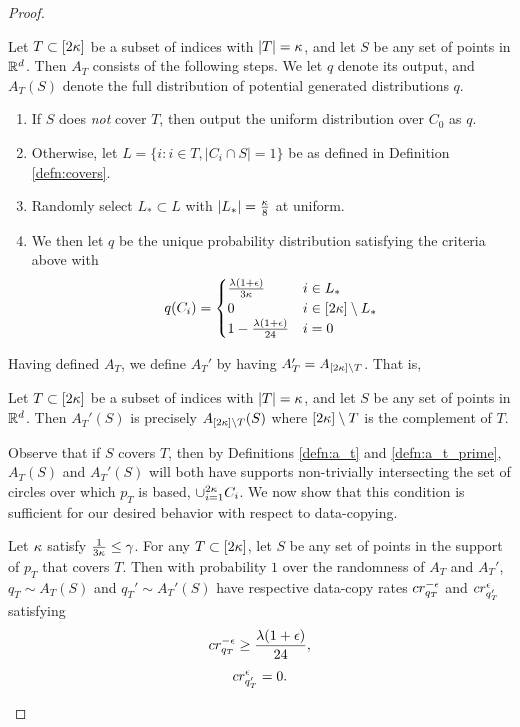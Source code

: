 \begin{proof}
\begin{definition}\label{defn:a_t}
Let $T \subset[2\kappa]$ be a subset of indices with $|T| = \kappa$, and let $S$ be any set of points in $\mathbb{R}^d$. Then $A_T$ consists of the following steps. We let $q$ denote its output, and $A_T(S)$ denote the full distribution of potential generated distributions $q$. 
	\begin{enumerate}
		\item If $S$ does \textit{not} cover $T$, then output the uniform distribution over $C_0$ as $q$.
		\item Otherwise, let $L = \{i: i \in T, |C_i \cap S| = 1\}$ be as defined in Definition \ref{defn:covers}.
		\item Randomly select $L_* \subset L$ with $|L_*| = \frac{\kappa}{8}$ at uniform.
		\item We then let $q$ be the unique probability distribution satisfying the criteria above with $$q(C_i) = \begin{cases} \frac{\lambda(1+\epsilon)}{3\kappa} & i \in L_* \\ 0 & i \in [2\kappa] \setminus L_* \\ 1 - \frac{\lambda(1 + \epsilon)}{24}  & i = 0 \end{cases}$$
	\end{enumerate}
\end{definition}

Having defined $A_T$, we define $A_T'$ by having $A_T' = A_{[2\kappa] \setminus T}$. That is, 

\begin{definition}\label{defn:a_t_prime}
Let $T \subset[2\kappa]$ be a subset of indices with $|T| = \kappa$, and let $S$ be any set of points in $\mathbb{R}^d$. Then $A_T'(S)$ is precisely $A_{[2\kappa] \setminus T}(S)$ where $[2\kappa] \setminus T$ is the complement of $T$. 
\end{definition}

Observe that if $S$ covers $T$, then by Definitions \ref{defn:a_t} and \ref{defn:a_t_prime}, $A_T(S)$ and $A_T'(S)$ will both have supports non-trivially intersecting the set of circles over which $p_T$ is based, $\cup_{i=1}^{2\kappa} C_i$. We now show that this condition is sufficient for our desired behavior with respect to data-copying. 

\begin{lemma}\label{lem:data_copy_bound}
Let $\kappa$ satisfy $\frac{1}{3\kappa} \leq \gamma$. For any $T \subset [2\kappa]$, let $S$ be any set of points in the support of $p_T$ that covers $T$. Then with probability $1$ over the randomness of $A_T$ and $A_T'$, $q_T \sim A_T(S)$ and $q_T' \sim A_T'(S)$ have respective data-copy rates $cr_{q_T}^{-\epsilon}$ and $cr_{q_T'}^{\epsilon}$ satisfying $$cr_{q_T}^{-\epsilon} \geq \frac{\lambda(1 + \epsilon) }{24},$$ $$cr_{q_T'}^{\epsilon} = 0.$$
\end{lemma}


\end{proof}
